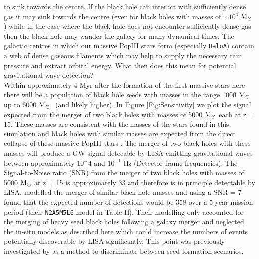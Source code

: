 \documentclass[graphics, twocolumn, usenatbib]{mn2e}
\newcommand{\msolar} {$\rm{M_{\odot}}~$}
\newcommand{\msolarc} {$\rm{M_{\odot}}$}
\newcommand{\hac} {\texttt{HaloA}}
\begin{document}
to sink towards the centre. If the black hole can interact with sufficiently dense gas it may
sink towards the centre (even for black holes with masses of $\sim 10^4$ \msolarc) while in
the case where the black hole does not encounter sufficiently dense gas then the black hole
may wander the galaxy for many dynamical times. The galactic centres in which our massive PopIII
stars form (especially \hac) contain a web of dense gaseous filaments which may help to supply
the necessary ram pressure and extract orbital energy. 
What then does this mean for potential gravitational wave detection?\\
\indent Within approximately 4 Myr after the formation of the first massive stars here there
will be a population of black hole seeds with masses in the range 1000 \msolar up to 6000 \msolar
(and likely higher). In Figure \ref{Fig:Sensitivity} we plot the signal expected from the
merger of two black holes with masses of 5000 \msolar each at z = 15. These masses
are consistent with the masses of the stars found in this simulation and black holes
with similar masses are expected from the direct collapse of these massive PopIII
stars \citep{Heger_2003}. The merger of two black holes with these masses will produce a
GW signal detecable by LISA \citep{Sesana_2016, Cornish_2017, Cornish_2020} emitting
gravitational waves between approximately $10{^-4}$ and $10^{-1}$ Hz (Detector frame frequencies). The
Signal-to-Noise ratio (SNR) from the merger of two black holes with masses of 5000 \msolar at z = 15
is approximately 33 and therefore is in principle detectable by LISA. \cite{Klein_2016} modelled
the merger of similar black hole masses and using a SNR = 7 found that the expected number of
detections would be 358 over a 5 year mission period (their \texttt{N2A5M5L6} model in Table II).
Their
modelling only accounted for the merging of heavy seed black holes following a galaxy merger and
neglected the in-situ models as described here which could increase the numbers of events potentially
discoverable by LISA significantly. This point was previously investigated by
\cite{Hartwig_2018} as a method to discriminate between seed formation scenarios. 
\end{document}
